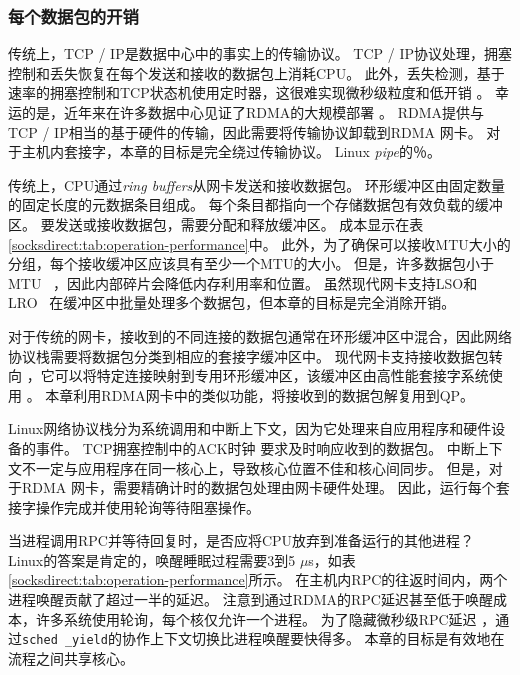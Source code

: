 \subsubsection{每个数据包的开销}
\label{socksdirect:subsec:per-packet-overhead}

传统上，TCP / IP是数据中心中的事实上的传输协议。
TCP / IP协议处理，拥塞控制和丢失恢复在每个发送和接收的数据包上消耗CPU。
此外，丢失检测，基于速率的拥塞控制和TCP状态机使用定时器，这很难实现微秒级粒度和低开销 \cite{jeong2014mtcp}。
幸运的是，近年来在许多数据中心见证了RDMA的大规模部署 \cite {guo2016rdma,zhu2015congestion,mittal2015timely}。
RDMA提供与TCP / IP相当的基于硬件的传输，因此需要将传输协议卸载到RDMA 网卡。
对于主机内套接字，本章的目标是完全绕过传输协议。 Linux \emph {pipe}的％。

传统上，CPU通过\emph {ring buffers}从网卡发送和接收数据包。
环形缓冲区由固定数量的固定长度的元数据条目组成。
每个条目都指向一个存储数据包有效负载的缓冲区。
要发送或接收数据包，需要分配和释放缓冲区。
成本显示在表 \ref {socksdirect:tab:operation-performance}中。
此外，为了确保可以接收MTU大小的分组，每个接收缓冲区应该具有至少一个MTU的大小。
但是，许多数据包小于MTU~ \cite {thompson1997wide}，因此内部碎片会降低内存利用率和位置。
虽然现代网卡支持LSO和LRO~ \cite {lsolro}在缓冲区中批量处理多个数据包，但本章的目标是完全消除开销。

对于传统的网卡，接收到的不同连接的数据包通常在环形缓冲区中混合，因此网络协议栈需要将数据包分类到相应的套接字缓冲区中。
现代网卡支持接收数据包转向 \cite {mellanox}，它可以将特定连接映射到专用环形缓冲区，该缓冲区由高性能套接字系统使用 \cite {jeong2014mtcp,lin2016scalable,libvma}。
本章利用RDMA网卡中的类似功能，将接收到的数据包解复用到QP。

Linux网络协议栈分为系统调用和中断上下文，因为它处理来自应用程序和硬件设备的事件。
TCP拥塞控制中的ACK时钟 \cite {mprdma}要求及时响应收到的数据包。
中断上下文不一定与应用程序在同一核心上，导致核心位置不佳和核心间同步。
但是，对于RDMA 网卡，需要精确计时的数据包处理由网卡硬件处理。
因此，\libipc {}运行每个套接字操作完成并使用轮询等待阻塞操作。



当进程调用RPC并等待回复时，是否应将CPU放弃到准备运行的其他进程？
Linux的答案是肯定的，唤醒睡眠过程需要3到5 $\mu$s，如表 \ref {socksdirect:tab:operation-performance}所示。
在主机内RPC的往返时间内，两个进程唤醒贡献了超过一半的延迟。
注意到通过RDMA的RPC延迟甚至低于唤醒成本，许多系统使用轮询，每个核仅允许一个进程。
为了隐藏微秒级RPC延迟 \cite {barroso2017attack}，通过\texttt {sched \_yield}的协作上下文切换比进程唤醒要快得多。
本章的目标是有效地在流程之间共享核心。

